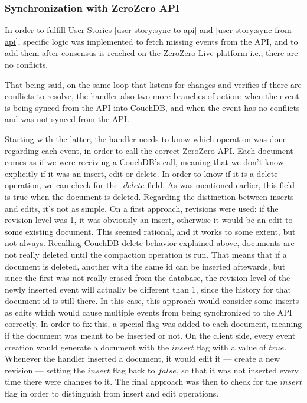 \subsubsection{Synchronization with ZeroZero API}

In order to fulfill User Stories \ref{user-story:sync-to-api} and \ref{user-story:sync-from-api}, specific logic was implemented to fetch missing events from the API, and to add them after consensus is reached on the ZeroZero Live platform i.e., there are no conflicts.

That being said, on the same loop that listens for changes and verifies if there are conflicts to resolve, the handler also two more branches of action: when the event is being synced from the API into CouchDB, and when the event has no conflicts and was not synced from the API.

Starting with the latter, the handler needs to know which operation was done regarding each event, in order to call the correct ZeroZero API. Each document comes as if we were receiving a CouchDB's  call, meaning that we don't know explicitly if it was an insert, edit or delete. In order to know if it is a delete operation, we can check for the $\_delete$ field. As was mentioned earlier, this field is true when the document is deleted. Regarding the distinction between inserts and edits, it's not as simple. On a first approach, revisions were used: if the revision level was 1, it was obviously an insert, otherwise it would be an edit to some existing document. This seemed rational, and it works to some extent, but not always. Recalling CouchDB delete behavior explained above, documents are not really deleted until the compaction operation is run. That means that if a document is deleted, another with the same id can be inserted aftewards, but since the first was not really erased from the database, the revision level of the newly inserted event will actually be different than 1, since the history for that document id is still there. In this case, this approach would consider some inserts as edits which would cause multiple events from being synchronized to the API correctly. In order to fix this, a special flag was added to each document, meaning if the document was meant to be inserted or not. On the client side, every event creation would generate a document with the $insert$ flag with a value of $true$. Whenever the handler inserted a document, it would edit it --- create a new revision --- setting the $insert$ flag back to $false$, so that it was not inserted every time there were changes to it. The final approach was then to check for the $insert$ flag in order to distinguish from insert and edit operations.

